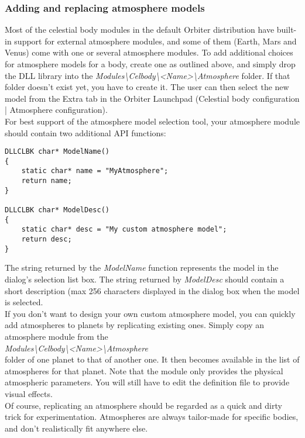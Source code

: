 \documentclass[Orbiter Developer Manual.tex]{subfiles}
\begin{document}
\subsubsection{Adding and replacing atmosphere models}
Most of the celestial body modules in the default Orbiter distribution have built-in support for external atmosphere modules, and some of them (Earth, Mars and Venus) come with one or several atmosphere modules. To add additional choices for atmosphere models for a body, create one as outlined above, and simply drop the DLL library into the \textit{Modules\textbackslash Celbody\textbackslash <Name>\textbackslash Atmosphere} folder. If that folder doesn't exist yet, you have to create it. The user can then select the new model from the Extra tab in the Orbiter Launchpad (Celestial body configuration | Atmosphere configuration).\\
For best support of the atmosphere model selection tool, your atmosphere module should contain two additional API functions:

\begin{lstlisting}
DLLCLBK char* ModelName()
{
	static char* name = "MyAtmosphere";
	return name;
}

DLLCLBK char* ModelDesc()
{
	static char* desc = "My custom atmosphere model";
	return desc;
}
\end{lstlisting}

\noindent
The string returned by the \textit{ModelName} function represents the model in the dialog's selection list box. The string returned by \textit{ModelDesc} should contain a short description (max 256 characters displayed in the dialog box when the model is selected.\\
If you don't want to design your own custom atmosphere model, you can quickly add atmospheres to planets by replicating existing ones. Simply copy an atmosphere module from the\\
\indent \textit{Modules\textbackslash Celbody\textbackslash <Name>\textbackslash Atmosphere}\\
folder of one planet to that of another one. It then becomes available in the list of atmospheres for that planet. Note that the module only provides the physical atmospheric parameters. You will still have to edit the definition file to provide visual effects.\\
Of course, replicating an atmosphere should be regarded as a quick and dirty trick for experimentation. Atmospheres are always tailor-made for specific bodies, and don't realistically fit anywhere else.
\end{document}
